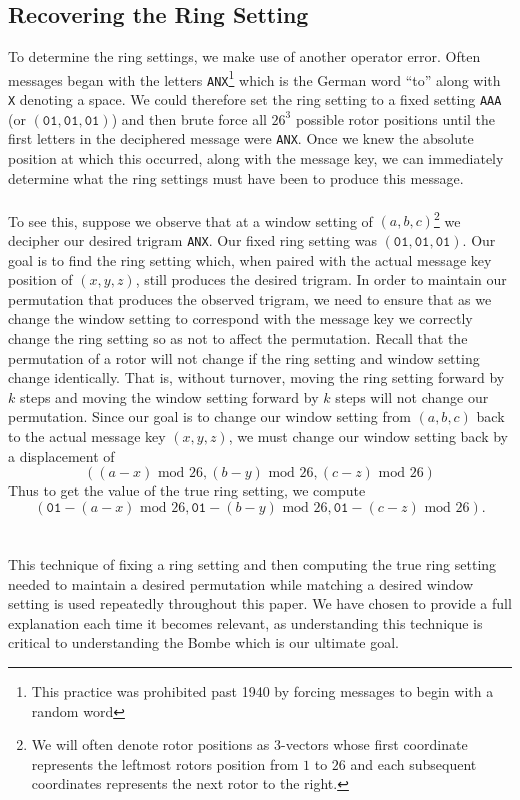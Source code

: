 \subsection{Recovering the Ring Setting}\label{cyclometer_ring_setting}
To determine the ring settings, we make use of another operator
error. Often messages began with the letters
\texttt{ANX}\footnote{This practice was prohibited past 1940 by
forcing messages to begin with a random word} which is
the German word ``to'' along with \texttt{X} denoting a space. We
could therefore set the ring setting to a fixed setting \texttt{AAA}
(or $(\texttt{01}, \texttt{01}, \texttt{01})$) and then
brute force all $26^3$ possible rotor positions until the first
letters in the deciphered message were \texttt{ANX}. Once we knew the
absolute position at which this occurred, along with the message key,
we can immediately determine what the ring settings must have been to
produce this message.
\\\\To see this, suppose we observe that at a window setting of
$(a,b,c)$\footnote{We will often denote rotor positions as
  $3$-vectors whose first coordinate represents the leftmost rotors
  position from $1$ to $26$ and each subsequent coordinates represents
the next rotor to the right.} we decipher our desired trigram \texttt{ANX}.
Our fixed ring setting was
$(\texttt{01}, \texttt{01}, \texttt{01})$. Our goal is to find the
ring setting which, when paired with the actual message key position
of $(x,y,z)$, still produces the desired trigram. In order to
maintain our permutation that produces the observed trigram, we need
to ensure that as we change the window setting to correspond with the
message key we correctly change the ring setting so as not
to affect the permutation. Recall that the permutation of a rotor
will not change if the ring setting and window setting change
identically. That is, without turnover, moving the ring setting
forward by $k$ steps and moving the window setting forward by $k$
steps will not change our permutation. Since our goal is to change
our window setting from $(a,b,c)$ back to the actual message key
$(x,y,z)$, we must change our window setting back by a displacement of
\[
  ((a-x)\text{ mod } 26, (b-y)\text{ mod }26, (c-z)\text{ mod }26)
\]
Thus to get the value of the true ring setting, we compute
\[
  (\texttt{01} - (a- x)\text{ mod }26, \texttt{01} - (b- y)\text{ mod
    }26, \texttt{01} - (c-
  z)\text{ mod }26).
\]
\\\\This technique of fixing a ring setting and then computing the
true ring setting needed to maintain a desired permutation while
matching a desired window setting is used repeatedly throughout this
paper. We have chosen to provide a full explanation each time it
becomes relevant, as understanding this technique is critical to
understanding the Bombe which is our ultimate goal.
